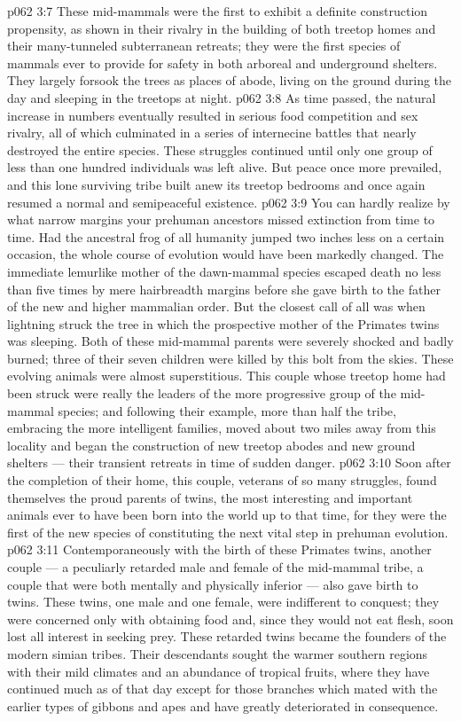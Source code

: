 \vs p062 3:7 These mid\hyp{}mammals were the first to exhibit a definite construction propensity, as shown in their rivalry in the building of both treetop homes and their many\hyp{}tunneled subterranean retreats; they were the first species of mammals ever to provide for safety in both arboreal and underground shelters. They largely forsook the trees as places of abode, living on the ground during the day and sleeping in the treetops at night.
\vs p062 3:8 As time passed, the natural increase in numbers eventually resulted in serious food competition and sex rivalry, all of which culminated in a series of internecine battles that nearly destroyed the entire species. These struggles continued until only one group of less than one hundred individuals was left alive. But peace once more prevailed, and this lone surviving tribe built anew its treetop bedrooms and once again resumed a normal and semipeaceful existence.
\vs p062 3:9 \pc You can hardly realize by what narrow margins your prehuman ancestors missed extinction from time to time. Had the ancestral frog of all humanity jumped two inches less on a certain occasion, the whole course of evolution would have been markedly changed. The immediate lemurlike mother of the dawn\hyp{}mammal species escaped death no less than five times by mere hairbreadth margins before she gave birth to the father of the new and higher mammalian order. But the closest call of all was when lightning struck the tree in which the prospective mother of the Primates twins was sleeping. Both of these mid\hyp{}mammal parents were severely shocked and badly burned; three of their seven children were killed by this bolt from the skies. These evolving animals were almost superstitious. This couple whose treetop home had been struck were really the leaders of the more progressive group of the mid\hyp{}mammal species; and following their example, more than half the tribe, embracing the more intelligent families, moved about two miles away from this locality and began the construction of new treetop abodes and new ground shelters --- their transient retreats in time of sudden danger.
\vs p062 3:10 Soon after the completion of their home, this couple, veterans of so many struggles, found themselves the proud parents of twins, the most interesting and important animals ever to have been born into the world up to that time, for they were the first of the new species of  constituting the next vital step in prehuman evolution.
\vs p062 3:11 \pc Contemporaneously with the birth of these Primates twins, another couple --- a peculiarly retarded male and female of the mid\hyp{}mammal tribe, a couple that were both mentally and physically inferior --- also gave birth to twins. These twins, one male and one female, were indifferent to conquest; they were concerned only with obtaining food and, since they would not eat flesh, soon lost all interest in seeking prey. These retarded twins became the founders of the modern simian tribes. Their descendants sought the warmer southern regions with their mild climates and an abundance of tropical fruits, where they have continued much as of that day except for those branches which mated with the earlier types of gibbons and apes and have greatly deteriorated in consequence.
